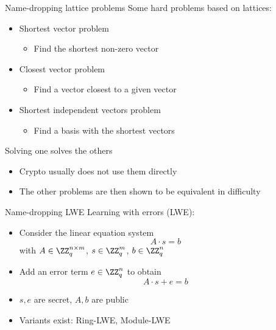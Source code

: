 \begin{frame}{Name-dropping lattice problems}
  Some hard problems based on lattices:
  \begin{itemize}[<+(1)->]
    \item Shortest vector problem
    \begin{itemize}
      \item Find the shortest non-zero vector
    \end{itemize}
    \item Closest vector problem
    \begin{itemize}
      \item Find a vector closest to a given vector
    \end{itemize}
    \item Shortest independent vectors problem
    \begin{itemize}
      \item Find a basis with the shortest vectors
    \end{itemize}
  \end{itemize}

  \pause
  Solving one solves the others
  \begin{itemize}[<+(1)->]
    \item Crypto usually does not use them directly
    \item The other problems are then shown to be equivalent in difficulty
  \end{itemize}
\end{frame}

\begin{frame}{Name-dropping LWE}
  Learning with errors (LWE):
  \begin{itemize}[<+(1)->]
    \item Consider the linear equation system
    \[
      A \cdot s = b
    \]
    with $A \in \ZZ_q^{n \times m}$, $s\in\ZZ_q^m$, $b\in\ZZ_q^n$
    \item Add an error term $e\in\ZZ_q^n$ to obtain
    \[
      A \cdot s + e = b
    \]
    \item $s, e$ are secret, $A, b$ are public
    \item Variants exist: Ring-LWE, Module-LWE
  \end{itemize}
\end{frame}


